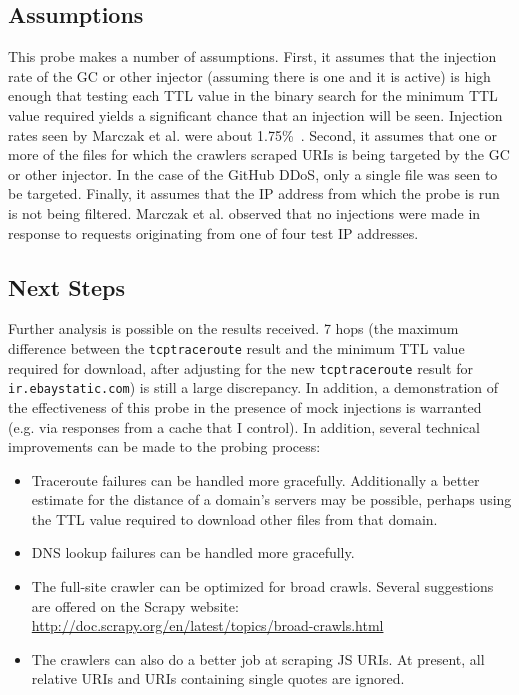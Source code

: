 \subsection{Assumptions}
This probe makes a number of assumptions.
First, it assumes that the injection rate of the GC or other injector (assuming there is one and it is active) is high enough that testing each TTL value in the binary search for the minimum TTL value required yields a significant chance that an injection will be seen.
Injection rates seen by Marczak et al. were about 1.75\%~\cite{Marczak2015}.
Second, it assumes that one or more of the files for which the crawlers scraped URIs is being targeted by the GC or other injector.
In the case of the GitHub DDoS, only a single file was seen to be targeted.
Finally, it assumes that the IP address from which the probe is run is not being filtered.
Marczak et al. observed that no injections were made in response to requests originating from one of four test IP addresses.
\subsection{Next Steps}
Further analysis is possible on the results received.
7 hops (the maximum difference between the \texttt{tcptraceroute} result and the minimum TTL value required for download, after adjusting for the new \texttt{tcptraceroute} result for \texttt{ir.ebaystatic.com}) is still a large discrepancy.
In addition, a demonstration of the effectiveness of this probe in the presence of mock injections is warranted (e.g. via responses from a cache that I control).
In addition, several technical improvements can be made to the probing process:
\begin{itemize}\addtolength{\itemsep}{-.35\baselineskip}
	\item Traceroute failures can be handled more gracefully.
		Additionally a better estimate for the distance of a domain's servers may be possible, perhaps using the TTL value required to download other files from that domain.
	\item DNS lookup failures can be handled more gracefully.
	\item The full-site crawler can be optimized for broad crawls.
		Several suggestions are offered on the Scrapy website: \url{http://doc.scrapy.org/en/latest/topics/broad-crawls.html}
	\item The crawlers can also do a better job at scraping JS URIs.
		At present, all relative URIs and URIs containing single quotes are ignored.
\end{itemize}